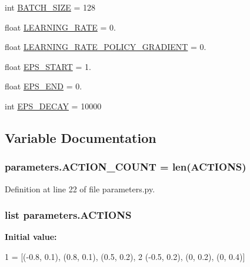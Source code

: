 \begin{DoxyCompactItemize}
int \hyperlink{namespaceparameters_a2d37d9950f7a887014021ab455282af6}{B\+A\+T\+C\+H\+\_\+\+S\+I\+ZE} = 128
\item 
float \hyperlink{namespaceparameters_afb996d542e8c3d3e8bbdfe4a711694dd}{L\+E\+A\+R\+N\+I\+N\+G\+\_\+\+R\+A\+TE} = 0.
\item 
float \hyperlink{namespaceparameters_aee9255eaabb90fcbf5ba1451159d8279}{L\+E\+A\+R\+N\+I\+N\+G\+\_\+\+R\+A\+T\+E\+\_\+\+P\+O\+L\+I\+C\+Y\+\_\+\+G\+R\+A\+D\+I\+E\+NT} = 0.
\item 
float \hyperlink{namespaceparameters_a371d0de003e9046dcc72450b7512ce14}{E\+P\+S\+\_\+\+S\+T\+A\+RT} = 1.
\item 
float \hyperlink{namespaceparameters_a3765f189d3af4815766ded3bffcba1e2}{E\+P\+S\+\_\+\+E\+ND} = 0.
\item 
int \hyperlink{namespaceparameters_ab9a88c663385563b35331bbea5c4a74b}{E\+P\+S\+\_\+\+D\+E\+C\+AY} = 10000
\end{DoxyCompactItemize}


\subsection{Variable Documentation}
\subsubsection[{\texorpdfstring{A\+C\+T\+I\+O\+N\+\_\+\+C\+O\+U\+NT}{ACTION_COUNT}}]{\setlength{\rightskip}{0pt plus 5cm}parameters.\+A\+C\+T\+I\+O\+N\+\_\+\+C\+O\+U\+NT = len({\bf A\+C\+T\+I\+O\+NS})}\hypertarget{namespaceparameters_ae4be13f6dac91f471da3efb4618a54c1}{}\label{namespaceparameters_ae4be13f6dac91f471da3efb4618a54c1}


Definition at line 22 of file parameters.\+py.

\subsubsection[{\texorpdfstring{A\+C\+T\+I\+O\+NS}{ACTIONS}}]{\setlength{\rightskip}{0pt plus 5cm}list parameters.\+A\+C\+T\+I\+O\+NS}\hypertarget{namespaceparameters_a585a25d0a26bcab4242d2e3fb1c1f93e}{}\label{namespaceparameters_a585a25d0a26bcab4242d2e3fb1c1f93e}
{\bfseries Initial value\+:}
\begin{DoxyCode}
1 = [(-0.8, 0.1), (0.8, 0.1), (0.5, 0.2),
2            (-0.5, 0.2), (0, 0.2), (0, 0.4)]
\end{DoxyCode}


